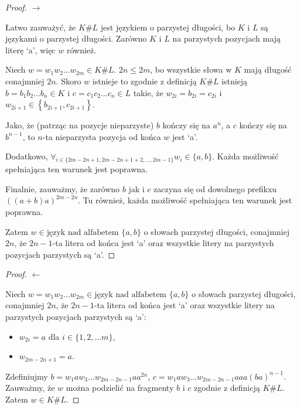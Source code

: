 \documentclass{article}
\theoremstyle{definition}
\theoremstyle{remark}
\begin{document}
\begin{proof}

\(\rightarrow\)

Łatwo zauważyć, że \(K \# L\) jest językiem o parzystej długości, bo \(K\) i \(L\) są językami o parzystej długości.
Zarówno \(K\) i \(L\) na parzystych pozycjach mają literę `a', więc \(w\) również.

Niech \(w = w_1 w_2 \ldots w_{2m} \in K \# L\). \(2n \leq 2m\), bo wszystkie słowa w \(K\) mają długość conajmniej \(2n\).
Skoro \(w\) istnieje to zgodnie z definicją \(K \# L\) istnieją \(b=b_1 b_2 \ldots b_n \in K\) i \(c=c_1 c_2 \ldots c_n \in L\) takie,
że \(w_{2i} = b_{2i} = c_{2i}\) i \(w_{2i+1} \in \left\{ b_{2i+1}, c_{2i+1} \right\}\).

Jako, że (patrząc na pozycje nieparzyste) \(b\) kończy się na \(a^n\), a \(c\) kończy się na \(b^{n-1}\), to \(n\)-ta
nieparzysta pozycja od końca \(w\) jest `a'.

Dodatkowo, \( \forall_{i \in \{2m - 2n + 1, 2m - 2n + 1 + 2, \ldots, 2m - 1 \}} w_i \in \{ a,b \}\). Każda możliwość
spełniająca ten warunek jest poprawna.

Finalnie, zauważmy, że zarówno \(b\) jak i \(c\) zaczyna się od dowolnego prefikxu \( ((a+b)a)^{2m-2n} \).
Tu również, każda możliwość spełniająca ten warunek jest poprawna.

Zatem \(w \in \text{język nad alfabetem } \{ a, b \}\) o słowach parzystej długości, conajmniej \(2n\), 
że \(2n-1\)-ta litera od końca jest `a' oraz wszystkie litery na parzystych pozycjach parzystych są `a'.

\end{proof}

\begin{proof}

    \(\leftarrow\)
    
    Niech \(w = w_1 w_2 \ldots w_{2m}\in \text{język nad alfabetem } \{ a, b \}\) o słowach parzystej długości, conajmniej \(2n\),
że \(2n-1\)-ta litera od końca jest `a' oraz wszystkie litery na parzystych pozycjach parzystych są `a':

\begin{itemize}
    \item \(w_{2i} = a\) dla \(i \in \{1, 2, \ldots m\}\),
    \item \(w_{2m-2n+1} = a\).
\end{itemize}

    Zdefiniujmy \(b = w_1 a w_3 \ldots w_{2m-2n-1} a a^{2n}\), \(c = w_1 a w_3 \ldots w_{2m-2n-1} a a a (ba)^{n-1}\).
    Zauważmy, że \(w\) można podzielić na fragmenty \(b\) i \(c\) zgodnie z definicją \(K \# L\).
    Zatem \(w \in K \# L\).

    \end{proof}
\end{document}
